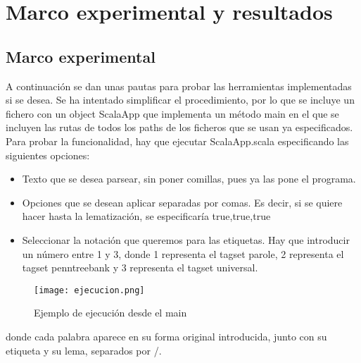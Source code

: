 \chapter{Marco experimental y resultados}
\label{conclusion}

\section{Marco experimental} 
A continuación se dan unas pautas para probar las herramientas implementadas si se desea. Se ha intentado simplificar el procedimiento, por lo que se incluye un fichero con un object \textsf{ScalaApp} que implementa un método main en el que se incluyen las rutas de todos los paths de los ficheros que se usan ya especificados. 
Para probar la funcionalidad, hay que ejecutar \textcolor{SchoolColor}{ScalaApp.scala} especificando las siguientes opciones:
\begin{itemize}
\item Texto que se desea parsear, sin poner comillas, pues ya las pone el programa.
\item Opciones que se desean aplicar separadas por comas. Es decir, si se quiere hacer hasta la lematización, se especificaría \textsf{true,true,true}
\item Seleccionar la notación que queremos para las etiquetas. Hay que introducir un número entre 1 y 3, donde 1 representa el tagset parole, 2 representa el tagset penntreebank y 3 representa el tagset universal.
\end{itemize}

\begin{figure}[H]%
\centering
\texttt{[image: ejecucion.png]}  %
\label{}
\caption{Ejemplo de ejecución desde el main}   
\end{figure}

donde cada palabra aparece en su forma original introducida, junto con su etiqueta y su lema, separados por \textsf{/}. 

